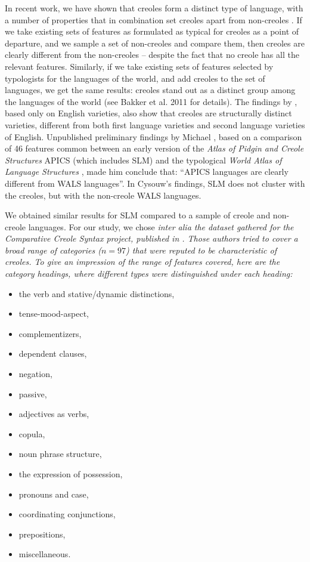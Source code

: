 In recent work, we have shown that creoles form a distinct type of language, with a number of properties that in combination set creoles apart from non-creoles \citep{BakkerEtAl2011}. If we take existing sets of features as formulated as typical for creoles as a point of departure, and we sample a set of non-creoles and compare them, then creoles are clearly different from the non-creoles -- despite the fact that no creole has all the relevant features. Similarly, if we take existing sets of features selected by typologists for the languages of the world, and add creoles to the set of languages, we get the same results: creoles stand out as a distinct group among the languages of the world (see Bakker et al. 2011 for details). The findings by    \citet{SzmrecsanyiEtAl2009}, based only on English varieties, also show that creoles are structurally distinct varieties, different from both first language varieties and second language varieties of English. Unpublished preliminary findings by Michael \citet{Cysouw2009apics}, based on a comparison of 46 features common between an early version of the \textit{Atlas of Pidgin and Creole Structures} APICS (which includes SLM) and the typological \textit{World Atlas of Language Structures} \citep[WALS;][]{WALS}, made him conclude that: ``APICS languages are clearly different from WALS languages''. In Cysouw's findings, SLM does not cluster with the creoles, but with the non-creole WALS languages.

We obtained similar results for SLM compared to a sample of creole and non-creole languages. For our study, we chose \em inter alia \em the dataset gathered for the \textit{Comparative Creole Syntax} project, published in \citet{HolmEtAlEd2007}. Those authors tried to cover a broad range of categories ($n=97$) that were reputed to be characteristic of creoles. To give an impression of the range of  features covered, here are the category headings, where different types were distinguished under each heading: 

\begin{itemize} 
\item the verb and stative/dynamic distinctions, 
\item tense-mood-aspect, 
\item complementizers, 
\item dependent clauses, 
\item negation, 
\item passive, 
\item adjectives as verbs, 
\item copula, 
\item noun phrase structure, 
\item the expression of possession, 
\item pronouns and case, 
\item coordinating conjunctions, 
\item prepositions, 
\item miscellaneous. 

\end{itemize}



